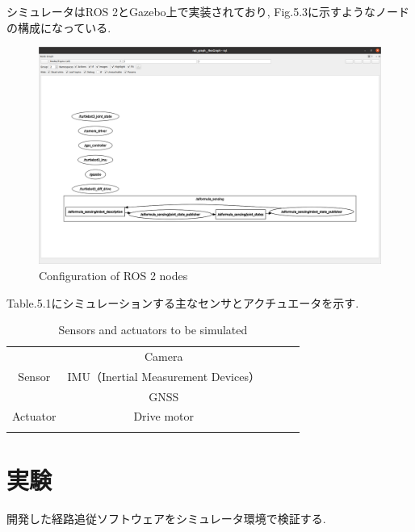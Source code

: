 \newpage

シミュレータはROS 2とGazebo上で実装されており, Fig.5.3に示すようなノードの構成になっている.

\begin{figure}[H]
  \centering
 \includegraphics[keepaspectratio, scale=0.2]
      {images/rqt.png}
 \caption{Configuration of ROS 2 nodes}
 \label{fig:simulator}
\end{figure}

Table.5.1にシミュレーションする主なセンサとアクチュエータを示す.

\begin{table}[H]
  \centering
  \caption{Sensors and actuators to be simulated}
  \begin{tabular}{lclll}
  \cline{1-2}
  \multicolumn{1}{|l|}{}         & \multicolumn{1}{c|}{Camera}      &  &  &  \\
  \multicolumn{1}{|c|}{Sensor}   & \multicolumn{1}{c|}{IMU（Inertial Measurement Devices）} &  &  &  \\
  \multicolumn{1}{|l|}{}         & \multicolumn{1}{c|}{GNSS}        &  &  &  \\ \cline{1-2}
  \multicolumn{1}{|l|}{Actuator} & \multicolumn{1}{c|}{Drive motor} &  &  &  \\ \cline{1-2}
                                 & \multicolumn{1}{l}{}             &  &  & 
  \end{tabular}
\end{table}

\section{実験}
開発した経路追従ソフトウェアをシミュレータ環境で検証する.

